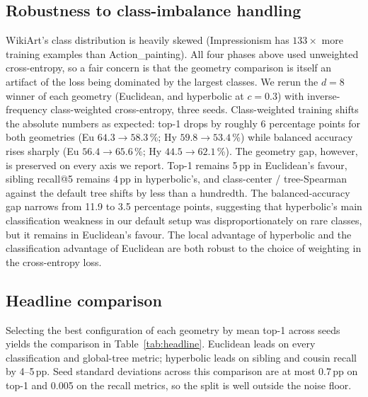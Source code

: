 \subsection{Robustness to class-imbalance handling}

WikiArt's class distribution is heavily skewed (Impressionism has
$133\times$ more training examples than Action\_painting). All four
phases above used unweighted cross-entropy, so a fair concern is that
the geometry comparison is itself an artifact of the loss being
dominated by the largest classes. We rerun the $d{=}8$ winner of
each geometry (Euclidean, and hyperbolic at $c{=}0.3$) with
inverse-frequency class-weighted cross-entropy, three seeds.
Class-weighted training shifts the absolute numbers as expected:
top-1 drops by roughly 6 percentage points for both geometries (Eu
$64.3 \to 58.3$\,\%; Hy $59.8 \to 53.4$\,\%) while balanced accuracy
rises sharply (Eu $56.4 \to 65.6$\,\%; Hy $44.5 \to 62.1$\,\%).
The geometry gap, however, is preserved on every axis we report. Top-1
remains 5\,pp in Euclidean's favour, sibling recall@5 remains 4\,pp
in hyperbolic's, and class-center / tree-Spearman against the default
tree shifts by less than a hundredth. The balanced-accuracy gap
narrows from 11.9 to 3.5 percentage points, suggesting that
hyperbolic's main classification weakness in our default setup was
disproportionately on rare classes, but it remains in Euclidean's
favour. The local advantage of hyperbolic and the classification
advantage of Euclidean are both robust to the choice of weighting in
the cross-entropy loss.

\subsection{Headline comparison}
\begin{table}[t]
  \centering
  \small
  
  \caption{Best Euclidean vs.\ best hyperbolic configuration across
  Phases~1--2, selected per geometry by mean top-1 accuracy across
  seeds. Mean $\pm$ seed standard deviation. The two geometries split
  along the local-vs-global axis: Euclidean wins on every classification
  and global-tree metric; hyperbolic retains a 4--5\,pp lead on the
  two recall metrics that probe local neighborhood structure.}
  \label{tab:headline}
\end{table}

Selecting the best configuration of each geometry by mean top-1
across seeds yields the comparison in Table~\ref{tab:headline}.
Euclidean leads on every classification and global-tree metric;
hyperbolic leads on sibling and cousin recall by 4--5\,pp. Seed
standard deviations across this comparison are at most 0.7\,pp on
top-1 and 0.005 on the recall metrics, so the split is well outside
the noise floor.


